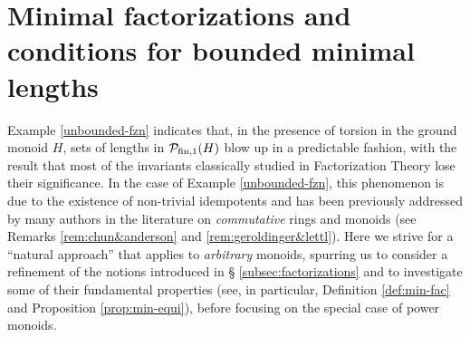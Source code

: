 \section{Minimal factorizations and conditions for bounded minimal lengths}
\label{sec:minimal-factorizations}
%
	
%
Example \ref{unbounded-fzn} indicates that, in the presence of torsion in the ground monoid $H$, sets of lengths in $\mathcal{P}_{\textrm{fin}, 1}(H)$ blow up in a predictable fashion, with the result that most of the invariants classically studied in Factorization Theory lose their significance. 
In the case of Example \ref{unbounded-fzn}, this phenomenon is due to the existence of non-trivial idempotents and has been previously addressed by many authors in the literature on \emph{commutative} rings and monoids (see Remarks \ref{rem:chun&anderson} and \ref{rem:geroldinger&lettl}).
Here we strive for a ``natural approach'' that applies to \emph{arbitrary} monoids, spurring us to consider a refinement of the notions introduced in \S{ }\ref{subsec:factorizations} and to investigate some of their fundamental properties (see, in particular, Definition \ref{def:min-fac} and Proposition \ref{prop:min-equi}), before focusing on the special case of power monoids.

